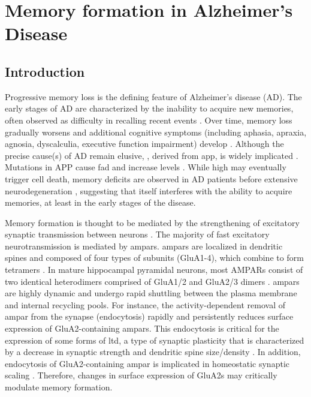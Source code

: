 \chapter{Memory formation in Alzheimer's Disease \label{chap-ad}}
\section{Introduction}

Progressive memory loss is the defining feature of Alzheimer’s disease (AD).  The early stages of AD are characterized by the inability to acquire new memories, often observed as difficulty in recalling recent events \citep{albert96, storandt89, wilson83}. Over time, memory loss gradually worsens and additional cognitive symptoms (including aphasia, apraxia, agnosia, dyscalculia, executive function impairment) develop \citep{shah06}. Although the precise cause(s) of AD remain elusive, \abeta{}, derived from \gls{app}, is widely implicated \citep{selkoe02, tanzi01}. Mutations in APP cause \gls{fad} \citep{hardy02,price98} and increase \abeta{} levels \citep{cai93, citron92}.  While high \abeta{} may eventually trigger cell death, memory deficits are observed in AD patients before extensive neurodegeneration \citep{selkoe02}, suggesting that \abeta{} itself interferes with the ability to acquire memories, at least in the early stages of the disease.  

Memory formation is thought to be mediated by the strengthening of excitatory synaptic transmission between neurons \citep{bailey93, lamprecht04}.  The majority of fast excitatory neurotransmission is mediated by \glspl{ampar}.  \Glspl{ampar} are localized in dendritic spines and composed of four types of subunits (GluA1-4), which combine to form tetramers \citep{hollmann94}.  In mature hippocampal pyramidal neurons, most AMPARs consist of two identical heterodimers comprised of GluA1/2 and GluA2/3 dimers \citep{wenthold96}.  \Glspl{ampar} are highly dynamic and undergo rapid shuttling between the plasma membrane and internal recycling pools. For instance, the activity-dependent removal of \gls{ampar} from the synapse (endocytosis) rapidly and persistently reduces surface expression of GluA2-containing \glspl{ampar}. This endocytosis is critical for the expression of some forms of \gls{ltd}, a type of synaptic plasticity that is characterized by a decrease in synaptic strength and dendritic spine size/density \citep{collingridge04, malinow02, zhou04}. In addition, endocytosis of GluA2-containing \gls{ampar} is implicated in homeostatic synaptic scaling \citep{gainey09}. Therefore, changes in surface expression of GluA2s may critically modulate memory formation.  

